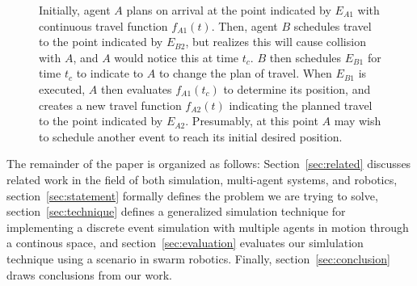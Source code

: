 \documentclass[conference,letterpaper]{IEEEtran}
\begin{document}
\begin{figure}[ht]

    \begin{center}
    \end{center}

    \caption{Initially, agent $A$ plans on arrival at the point indicated by
    $E_{A1}$ with continuous travel function $f_{A1}(t)$. Then, agent $B$
    schedules travel to the point indicated by $E_{B2}$, but realizes this will
    cause collision with $A$, and $A$ would notice this at time $t_c$. $B$ then
    schedules $E_{B1}$ for time $t_c$ to indicate to $A$ to change the plan of
    travel. When $E_{B1}$ is executed, $A$ then evaluates $f_{A1}(t_c)$ to
    determine its position, and creates a new travel function $f_{A2}(t)$
    indicating the planned travel to the point indicated by $E_{A2}$.
    Presumably, at this point $A$ may wish to schedule another event to reach
    its initial desired position.}
    \label{fig:introagentfunctions}

\end{figure}

The remainder of the paper is organized as follows: Section~\ref{sec:related}
discusses related work in the field of both simulation, multi-agent systems,
and robotics, section~\ref{sec:statement} formally defines the problem we are
trying to solve, section~\ref{sec:technique} defines a generalized simulation
technique for implementing a discrete event simulation with multiple agents in
motion through a continous space, and section~\ref{sec:evaluation} evaluates
our simlulation technique using a scenario in swarm robotics. Finally,
section~\ref{sec:conclusion} draws conclusions from our work.
\end{document}
